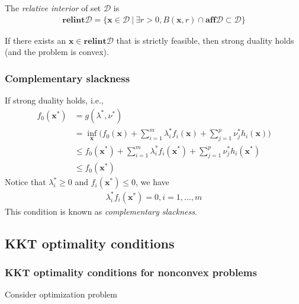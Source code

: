\begin{definition}
    The \emph{relative interior} of set $\mathcal{D}$ is
    \begin{align}
        \mathbf{relint}\mathcal{D} = 
        \{ \mathbf{x} \in \mathcal{D} \ | \ \exists r > 0, 
        B(\mathbf{x}, r) \cap \mathbf{aff}\mathcal{D}
        \subset \mathcal{D}\}
    \end{align}
\end{definition}

\begin{theorem}
    If there exists an $\mathbf{x} \in \mathbf{relint}
    \mathcal{D}$ that is strictly feasible, 
    then strong duality holds (and the problem is convex).
\end{theorem}

\subsubsection{Complementary slackness}
If strong duality holds, i.e.,
\begin{align}
    f_0(\mathbf{x}^*) &= 
    g(\lambda^*, \nu^*) \\
    &= \inf_{\mathbf{x}} \Big(f_0(\mathbf{x}) +
    \sum_{i=1}^m \lambda_i^* f_i(\mathbf{x}) +
    \sum_{j=1}^p \nu_j^* h_i(\mathbf{x})
    \Big) \\
    &\leq f_0(\mathbf{x}^*) +
    \sum_{i=1}^m \lambda_i^* f_i(\mathbf{x}^*) +
    \sum_{j=1}^p \nu_j^* h_i(\mathbf{x}^*) \\
    &\leq f_0(\mathbf{x}^*)
\end{align}
Notice that $\lambda_i^* \geq 0$ and
$f_i(\mathbf{x}^*) \leq 0$, we have 
\begin{align}
    \lambda_i^* f_i(\mathbf{x}^*) = 0, i = 1,..., m
    \label{equ:comp-slack}
\end{align}
This condition is known as \emph{complementary slackness}.

\subsection{KKT optimality conditions}
\subsubsection{KKT optimality conditions for nonconvex problems}

Consider optimization problem


